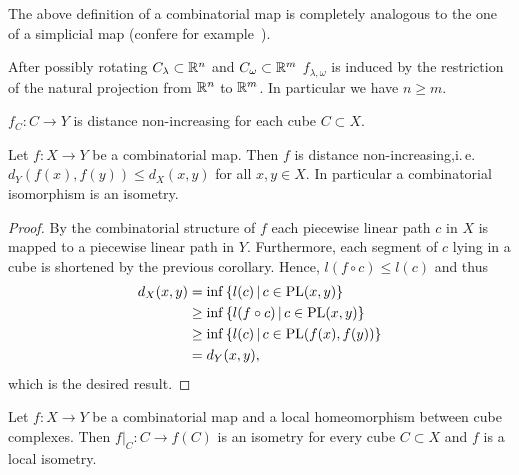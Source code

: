 \begin{rem}
  The above definition of a combinatorial map is completely analogous to the one of a simplicial map (confere for example~\cite{Singer}).
\end{rem}

\begin{lemma}
  After possibly rotating \(C_\lambda \subset \mathbb{R}^n\) and \(C_\omega \subset \mathbb{R}^m\) \(f_{\lambda, \omega}\) is induced by the restriction of the natural projection from \(\mathbb{R}^n\) to \(\mathbb{R}^m\). In particular we have \(n \geq m\).
\end{lemma}

\begin{cor}
  \(f_C\colon C \to Y\) is distance non-increasing for each cube \(C \subset X\).
\end{cor}

\begin{prop}
  Let \(f\colon X \to Y\) be a combinatorial map. Then \(f\) is distance non-increasing,i.\,e.\ \(d_Y(f(x), f(y)) \leq d_X(x,y)\) for all \(x,y \in X\). In particular a combinatorial isomorphism is an isometry.
\end{prop}

\begin{proof}
  By the combinatorial structure of \(f\) each piecewise linear path \(c\) in \(X\) is mapped to a piecewise linear path in \(Y\). Furthermore, each segment of \(c\) lying in a cube is shortened by the previous corollary. Hence, \(l(f \circ c) \leq l(c)\) and thus
  \begin{align*}
    d_X(x,y)
    & = \inf\left\{l(c) \,\middle|\, c \in \operatorname{PL}(x,y)\right\}\\
    & \geq \inf\left\{l(f \circ c) \,\middle|\, c \in \operatorname{PL}(x,y)\right\}\\
    & \geq \inf\left\{l(c) \,\middle|\, c \in \operatorname{PL}(f(x), f(y))\right\}\\
    & = d_Y(x,y),
  \end{align*}
  which is the desired result.
\end{proof}

\begin{lemma}
  Let \(f\colon X \to Y\) be a combinatorial map and a local homeomorphism between cube complexes. Then \(f|_C\colon C \to f(C)\) is an isometry for every cube \(C \subset X\) and \(f\) is a local isometry.
\end{lemma}

